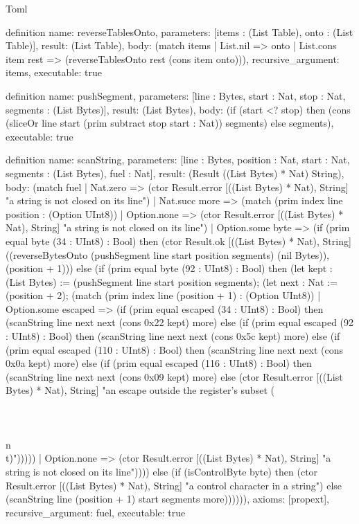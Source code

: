 \begin{lexlean}{Toml}
\begin{semanticmodule}
definition{
  name: reverseTablesOnto,
  parameters: [items : (List Table), onto : (List Table)],
  result: (List Table),
  body: (match items
    | List.nil => onto
    | List.cons item rest => (reverseTablesOnto rest (cons item onto))),
  recursive_argument: items,
  executable: true
}

definition{
  name: pushSegment,
  parameters: [line : Bytes, start : Nat, stop : Nat, segments : (List Bytes)],
  result: (List Bytes),
  body: (if (start <? stop) then (cons (sliceOr line start (prim subtract stop start : Nat)) segments) else segments),
  executable: true
}

definition{
  name: scanString,
  parameters: [line : Bytes, position : Nat, start : Nat, segments : (List Bytes), fuel : Nat],
  result: (Result ((List Bytes) * Nat) String),
  body: (match fuel
    | Nat.zero => (ctor Result.error [((List Bytes) * Nat), String] "a string is not closed on its line")
    | Nat.succ more => (match (prim index line position : (Option UInt8))
      | Option.none => (ctor Result.error [((List Bytes) * Nat), String] "a string is not closed on its line")
      | Option.some byte => (if (prim equal byte (34 : UInt8) : Bool) then (ctor Result.ok [((List Bytes) * Nat), String] ((reverseBytesOnto (pushSegment line start position segments) (nil Bytes)), (position + 1))) else (if (prim equal byte (92 : UInt8) : Bool) then (let kept : (List Bytes) := (pushSegment line start position segments); (let next : Nat := (position + 2); (match (prim index line (position + 1) : (Option UInt8))
        | Option.some escaped => (if (prim equal escaped (34 : UInt8) : Bool) then (scanString line next next (cons 0x22 kept) more) else (if (prim equal escaped (92 : UInt8) : Bool) then (scanString line next next (cons 0x5c kept) more) else (if (prim equal escaped (110 : UInt8) : Bool) then (scanString line next next (cons 0x0a kept) more) else (if (prim equal escaped (116 : UInt8) : Bool) then (scanString line next next (cons 0x09 kept) more) else (ctor Result.error [((List Bytes) * Nat), String] "an escape outside the register's subset (\\\" \\\\ \\n \\t)")))))
        | Option.none => (ctor Result.error [((List Bytes) * Nat), String] "a string is not closed on its line")))) else (if (isControlByte byte) then (ctor Result.error [((List Bytes) * Nat), String] "a control character in a string") else (scanString line (position + 1) start segments more)))))),
  axioms: [propext],
  recursive_argument: fuel,
  executable: true
}


\end{semanticmodule}
\end{lexlean}
